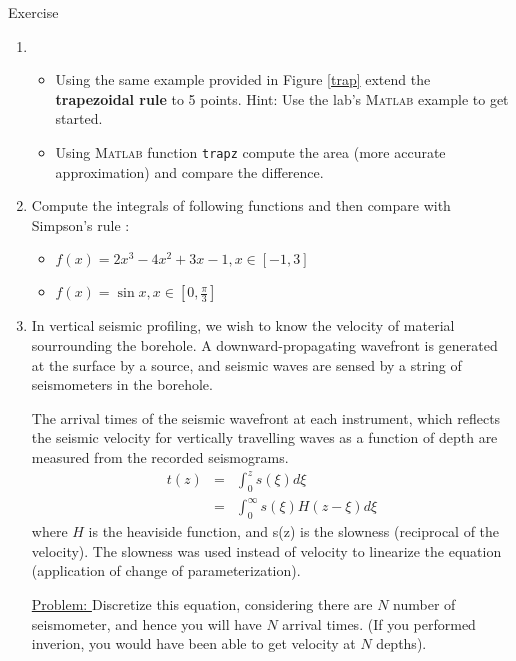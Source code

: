 \documentclass[11pt,titlepage,fleqn]{article}
\newcommand{\matlab}{\textsc{Matlab}\xspace}
\begin{document}
\begin{section}{Exercise}
\begin{enumerate}
\item 
\begin{itemize}
\item Using the same example provided in Figure \ref{trap} extend the {\bf trapezoidal rule} to 5 points. Hint: Use the lab's \matlab example to get started.
\item Using \matlab function \verb+trapz+ compute the area (more accurate approximation) and compare the difference.
\end{itemize}

\item Compute the integrals of following functions and then compare with Simpson's rule :
\begin{itemize}
\item $f(x) = 2x^3 - 4x^2 + 3x -1, x \in [-1, 3]$
\item $f(x) = \sin x, x \in [0,\frac{\pi}{3}]$
\end{itemize}

\item In vertical seismic profiling, we wish to know the velocity of material sourrounding the borehole. A downward-propagating wavefront is generated at the surface by a source, and seismic waves are sensed by a string of seismometers in the borehole.

The arrival times of the seismic wavefront at each instrument, which reflects the seismic velocity for vertically travelling waves as a function of depth are measured from the recorded seismograms.
\begin{eqnarray}
t(z) &=& \int_0^z s(\xi) d\xi \\
&=& \int_0^\infty s(\xi) H(z - \xi) d\xi
\end{eqnarray}
where $H$ is the heaviside function, and s(z) is the slowness (reciprocal of the velocity). The slowness was used instead of velocity to linearize the equation (application of change of parameterization).

\underline{Problem: } Discretize this equation, considering there are $N$ number of seismometer, and hence you will have $N$ arrival times. (If you performed inverion, you would have been able to get velocity at $N$ depths).

\end{enumerate}
\end{section}
\end{document}
